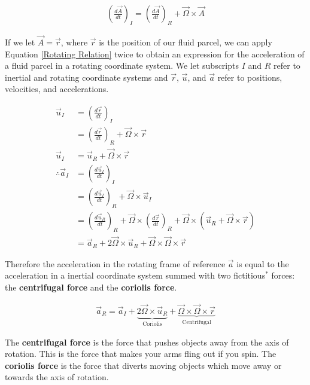 \begin{align}
    \left(\frac{d\vec{A}}{dt}\right)_I=\left(\frac{d\vec{A}}{dt}\right)_R+\vec{\Omega}\times\vec{A}
    \label{Rotating Relation}
\end{align}

If we let $\vec{A}=\vec{r}$, where $\vec{r}$ is the position of our fluid parcel, we can apply Equation \ref{Rotating Relation} twice to obtain an expression for the acceleration of a fluid parcel in a rotating coordinate system. We let subscripts $I$ and $R$ refer to inertial and rotating coordinate systems and $\vec{r}$, $\vec{u}$, and $\vec{a}$ refer to positions, velocities, and accelerations.

\begin{align*}
    \vec{u}_I &= \left( \frac{d\vec{r}}{dt} \right)_I\\
    &= \left( \frac{d\vec{r}}{dt} \right)_R+\vec{\Omega}\times \vec{r}\\
    \vec{u}_I & = \vec{u}_R+\vec{\Omega}\times \vec{r}\\
    \therefore \vec{a}_I & =
    \left( \frac{d\vec{u}_I}{dt} \right)_I\\
    &= \left( \frac{d\vec{u}_I}{dt} \right)_R+\vec{\Omega}\times \vec{u}_I\\
    &= \left( \frac{d\vec{u}_R}{dt} \right)_R
    +\vec{\Omega}\times\left( \frac{d\vec{r}}{dt} \right)_R
    +\vec{\Omega}\times\left( 
        \vec{u}_R+\vec{\Omega}\times \vec{r}
     \right)\\
    &=\vec{a}_R+2\vec{\Omega}\times\vec{u}_R+\vec{\Omega}\times\vec{\Omega}\times\vec{r}
\end{align*}

Therefore the acceleration in the rotating frame of reference $\vec{a}$ is equal to the acceleration in a inertial coordinate system summed with two fictitious\href{https://xkcd.com/123/}{$^*$}  forces: the \textbf{centrifugal force} and the \textbf{coriolis force}.

\begin{align}
    \vec{a}_R=\vec{a}_I+\underbrace{2\vec{\Omega}\times\vec{u}_R}_\text{Coriolis}
    +\underbrace{\vec{\Omega}\times\vec{\Omega}\times\vec{r}}_\text{Centrifugal}
\end{align}

The \textbf{centrifugal force} is the force that pushes objects away from the axis of rotation. This is the force that makes your arms fling out if you spin. The \textbf{coriolis force} is the force that diverts moving objects which move away or towards the axis of rotation. 

